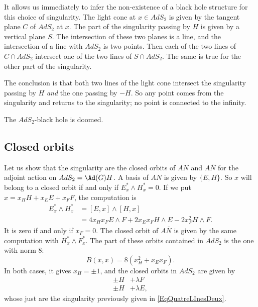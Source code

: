 It allows us immediately to infer the non-existence of a black hole structure for this choice of singularity. The light cone at $x\in AdS_2$ is given by the tangent plane $C$ of $AdS_2$ at $x$. The part of the singularity passing by $H$ is given by a vertical plane $S$. The intersection of these two planes is a line, and the intersection of a line with $AdS_2$ is two points. Then each of the two lines of $C\cap AdS_2$ intersect one of the two lines of $S\cap AdS_2$. The same is true for the other part of the singularity.

The conclusion is that both two lines of the light cone intersect the singularity passing by $H$ \emph{and} the one passing by $-H$.  So any point comes from the singularity and returns to the singularity; no point is connected to the infinity.

The $AdS_2$-black hole is doomed.

\subsection{Closed orbits}

Let us show that the singularity are the closed orbits of $AN$
and $A\bar{N}$ for the adjoint action on $AdS_2=\Ad(G)H$. A basis of $AN$
is given by $\{E,H\}$. So $x$ will belong to a closed orbit if and only if
$E_x^*\wedge H^*_x=0$. If we put $x=x_HH+x_EE+x_FF$, the computation is
\begin{equation}
	\begin{split}
		E_x^*\wedge H^*_x&=[E,x]\wedge[H,x]\\
		&=4x_Hx_F E\wedge F+2x_Ex_F H\wedge E-2x_F^2 H\wedge F.
	\end{split}
\end{equation}
It is zero if and only if $x_F=0$. The closed orbit of $A\bar{N}$ is given by the same computation with $H^*_x\wedge F^*_x$. The part of these orbits contained in $AdS_2$ is the one with norm $8$:
\begin{equation}
	B(x,x)=8(x_H^2+x_Ex_F).
\end{equation}
In both cases, it gives $x_H=\pm 1$, and the closed orbits in $AdS_2$ are given by
\begin{subequations}
	\begin{align}
		\pm H & +\lambda F  \\
		\pm H & +\lambda E,
	\end{align}
\end{subequations}
whose just are the singularity previously given in \eqref{EqQuatreLInesDeux}.


